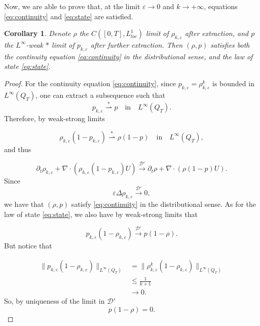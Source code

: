 \documentclass[11pt,twoside]{article}
\numberwithin{equation}{section}
\newcommand {\eps}  {\varepsilon}
\newcommand {\f}   {\frac}
\newcommand {\p}   {\partial}
\newtheorem{corollary}[theorem]{Corollary}
\begin{document}
Now, we are able to prove that, at the limit $\eps \to 0$ and $k \to + \infty$, equations \eqref{eq:continuity} and \eqref{eq:state} are satisfied.

\begin{corollary}
\label{thm:state&cont}
    Denote $\rho$ the $C([0,T],L^1_{loc})$ limit of $\rho_{k,\eps}$ after extraction, and $p$ the $L^\infty$-weak $\ast$ limit of $p_{k,\eps}$ after further extraction. Then $(\rho,p)$ satisfies both the continuity equation \eqref{eq:continuity} in the distributional sense, and the law of state \eqref{eq:state}.
\end{corollary}

\begin{proof}
    For the continuity equation \eqref{eq:continuity}, since $p_{k,\eps} = \rho_{k,\eps}^k$ is bounded in $L^{\infty}(Q_T)$, one can extract a subsequence such that 
    \[
    p_{k,\eps} \overset{\ast}{\rightharpoonup} p 
\quad \text{in} \quad L^{\infty}(Q_T).
    \]
    Therefore, by weak-strong limits 

    \[
    \rho_{k,\eps}(1-p_{k,\eps}) \overset{\ast}{\rightharpoonup} \rho(1-p) 
\quad \text{in} \quad L^{\infty}(Q_T),
    \]
    and thus 

    \[
    \p_t \rho_{k,\eps} + \nabla \cdot (\rho_{k,\eps}(1-p_{k,\eps})U) \overset{\mathcal{D}'}{\longrightarrow} \p_t \rho +\nabla \cdot (\rho(1-p)U).
    \]
    Since 
    \[
    \eps \Delta \rho_{k,\eps} \overset{\mathcal{D}'}{\longrightarrow} 0,
    \]
    we have that $(\rho,p)$ satisfy \eqref{eq:continuity} in the distributional sense. As for the law of state \eqref{eq:state}, we also have by weak-strong limits that 

    \[
    p_{k,\eps}(1-\rho_{k,\eps}) \overset{\mathcal{D}'}{\longrightarrow} p(1-\rho).
    \]
    But notice that 

    \[
    \begin{aligned}
    \|p_{k,\eps}(1-\rho_{k,\eps})\|_{L^{\infty}(Q_T)} &= \|\rho_{k,\eps}^k(1-\rho_{k,\eps})\|_{L^{\infty}(Q_T)}\\
    &\le \f{1}{k+1}\\
    &\longrightarrow 0.
    \end{aligned}
    \]
    So, by uniqueness of the limit in $\mathcal{D}'$
    \[
    p(1-\rho) = 0.
    \]
\end{proof}
\end{document}
